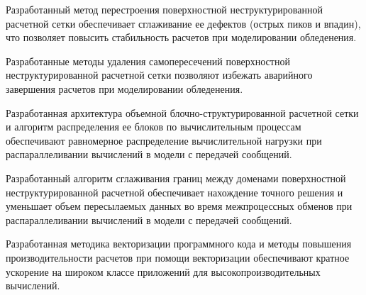 \item Разработанный метод перестроения поверхностной неструктурированной расчетной сетки обеспечивает сглаживание ее дефектов (острых пиков и впадин), что позволяет повысить стабильность расчетов при моделировании обледенения.
\item Разработанные методы удаления самопересечений поверхностной неструктурированной расчетной сетки позволяют избежать аварийного завершения расчетов при моделировании обледенения.
\item Разработанная архитектура объемной блочно-структурированной расчетной сетки и алгоритм распределения ее блоков по вычислительным процессам обеспечивают равномерное распределение вычислительной нагрузки при распараллеливании вычислений в модели с передачей сообщений.
\item Разработанный алгоритм сглаживания границ между доменами поверхностной неструктурированной расчетной обеспечивает нахождение точного решения и уменьшает объем пересылаемых данных во время межпроцессных обменов при распараллеливании вычислений в модели с передачей сообщений.
\item Разработанная методика векторизации программного кода и методы повышения производительности расчетов при помощи векторизации обеспечивают кратное ускорение на широком классе приложений для высокопроизводительных вычислений.